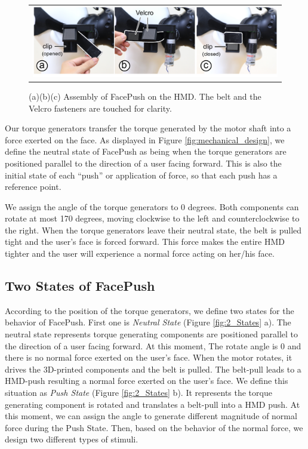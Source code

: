 \begin{figure}[b]
\begin{center}
    \begin{tabular}{@{\hspace{0.1cm}}c}
    \includegraphics[width=1\textwidth]{figures/AssemblySystem.pdf}
    \end{tabular}
    \caption{(a)(b)(c) Assembly of FacePush on the HMD. The belt and the Velcro fasteners are touched for clarity.}
    \label{fig:assemblyandsystem}
    \end{center}
\end{figure}

Our torque generators transfer the torque generated by the motor shaft into a force exerted on the face. As displayed in Figure \ref{fig:mechanical_design}, we define the neutral state of FacePush as being when the torque generators are positioned parallel to the direction of a user facing forward. This is also the initial state of each ``push'' or application of force, so that each push has a reference point.

We assign the angle of the torque generators to 0 degrees. Both components can rotate at most 170 degrees, moving clockwise to the left and counterclockwise to the right. When the torque generators leave their neutral state, the belt is pulled tight and the user's face is forced forward. This force makes the entire HMD tighter and the user will experience a normal force acting on her/his face. 

\subsection{Two States of FacePush }

According to the position of the torque generators, we define two states for the behavior of FacePush. First one is \textit{Neutral State} (Figure \ref{fig:2_States} a). The neutral state represents torque generating components are positioned parallel to the direction of a user facing forward. At this moment, The rotate angle is 0 and there is no normal force exerted on the user's face. When the motor rotates, it drives the 3D-printed components and the belt is pulled. The belt-pull leads to a HMD-push resulting a normal force exerted on the user's face. We define this situation as \textit{Push State} (Figure \ref{fig:2_States} b). It represents the torque generating component is rotated and translates a belt-pull into a HMD push. At this moment, we can assign the angle to generate different magnitude of normal force during the Push State. Then, based on the behavior of the normal force, we design two different types of stimuli.

